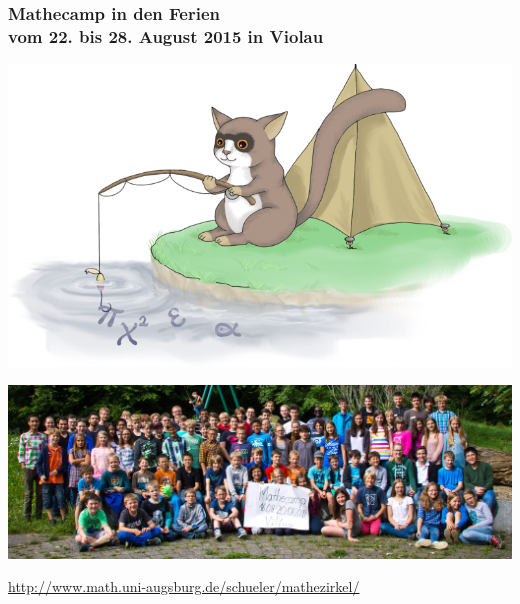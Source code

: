 \documentclass[12pt,compress,ngerman,utf8,t]{beamer}
\begin{document}
\begin{frame}\frametitle{Mathecamp in den Ferien \\[-0.4em] \scriptsize vom 22. bis 28. August 2015 in Violau}
  \vspace{-0.4cm}
  \begin{center}
    \includegraphics[scale=0.2]{images/mathecamp-gregor}
    \medskip

    \includegraphics[scale=1.6]{images/mathecamp-foto}
    \medskip

    \vfill
    \tiny
    \href{http://www.math.uni-augsburg.de/schueler/mathezirkel/}{http:/\!/www.math.uni-augsburg.de/schueler/mathezirkel/}
  \end{center}
\end{frame}
\end{document}
